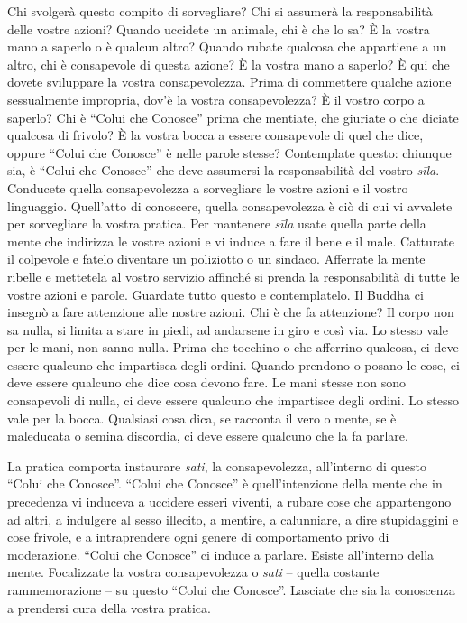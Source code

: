 Chi svolgerà questo compito di sorvegliare? Chi si assumerà la
responsabilità delle vostre azioni? Quando uccidete un animale, chi è
che lo sa? È la vostra mano a saperlo o è qualcun altro? Quando rubate
qualcosa che appartiene a un altro, chi è consapevole di questa azione?
È la vostra mano a saperlo? È qui che dovete sviluppare la vostra
consapevolezza. Prima di commettere qualche azione sessualmente
impropria, dov'è la vostra consapevolezza? È il vostro corpo a saperlo?
Chi è ``Colui che Conosce'' prima che mentiate, che giuriate o che
diciate qualcosa di frivolo? È la vostra bocca a essere consapevole di
quel che dice, oppure ``Colui che Conosce'' è nelle parole stesse?
Contemplate questo: chiunque sia, è ``Colui che Conosce'' che deve
assumersi la responsabilità del vostro \emph{sīla}. Conducete quella
consapevolezza a sorvegliare le vostre azioni e il vostro linguaggio.
Quell'atto di conoscere, quella consapevolezza è ciò di cui vi avvalete
per sorvegliare la vostra pratica. Per mantenere \emph{sīla} usate
quella parte della mente che indirizza le vostre azioni e vi induce a
fare il bene e il male. Catturate il colpevole e fatelo diventare un
poliziotto o un sindaco. Afferrate la mente ribelle e mettetela al
vostro servizio affinché si prenda la responsabilità di tutte le vostre
azioni e parole. Guardate tutto questo e contemplatelo. Il Buddha ci
insegnò a fare attenzione alle nostre azioni. Chi è che fa attenzione?
Il corpo non sa nulla, si limita a stare in piedi, ad andarsene in giro
e così via. Lo stesso vale per le mani, non sanno nulla. Prima che
tocchino o che afferrino qualcosa, ci deve essere qualcuno che
impartisca degli ordini. Quando prendono o posano le cose, ci deve
essere qualcuno che dice cosa devono fare. Le mani stesse non sono
consapevoli di nulla, ci deve essere qualcuno che impartisce degli
ordini. Lo stesso vale per la bocca. Qualsiasi cosa dica, se racconta il
vero o mente, se è maleducata o semina discordia, ci deve essere
qualcuno che la fa parlare.

La pratica comporta instaurare \emph{sati}, la consapevolezza,
all'interno di questo ``Colui che Conosce''. ``Colui che Conosce'' è
quell'intenzione della mente che in precedenza vi induceva a uccidere
esseri viventi, a rubare cose che appartengono ad altri, a indulgere al
sesso illecito, a mentire, a calunniare, a dire stupidaggini e cose
frivole, e a intraprendere ogni genere di comportamento privo di
moderazione. ``Colui che Conosce'' ci induce a parlare. Esiste
all'interno della mente. Focalizzate la vostra consapevolezza o
\emph{sati} -- quella costante rammemorazione -- su questo ``Colui che
Conosce''. Lasciate che sia la conoscenza a prendersi cura della vostra
pratica.


